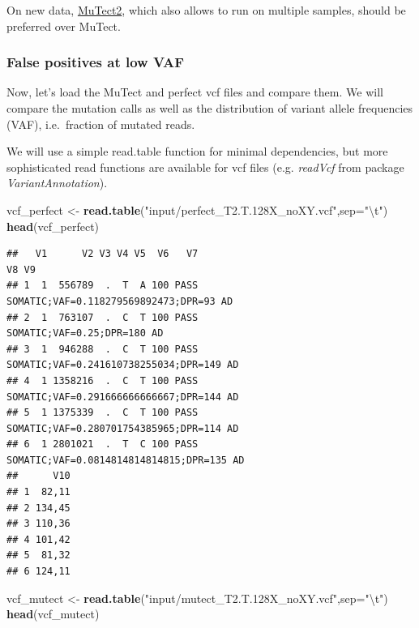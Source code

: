 \documentclass[]{article}
\newenvironment{Shaded}{\begin{snugshade}}{\end{snugshade}}
\newcommand{\CharTok}[1]{\textcolor[rgb]{0.31,0.60,0.02}{#1}}
\newcommand{\DataTypeTok}[1]{\textcolor[rgb]{0.13,0.29,0.53}{#1}}
\newcommand{\KeywordTok}[1]{\textcolor[rgb]{0.13,0.29,0.53}{\textbf{#1}}}
\newcommand{\NormalTok}[1]{#1}
\newcommand{\StringTok}[1]{\textcolor[rgb]{0.31,0.60,0.02}{#1}}
\begin{document}
On new data,
\href{https://gatk.broadinstitute.org/hc/en-us/articles/360037593851-Mutect2}{MuTect2},
which also allows to run on multiple samples, should be preferred over
MuTect.

\hypertarget{false-positives-at-low-vaf}{%
\subsubsection{False positives at low
VAF}\label{false-positives-at-low-vaf}}

Now, let's load the MuTect and perfect vcf files and compare them. We
will compare the mutation calls as well as the distribution of variant
allele frequencies (VAF), i.e.~fraction of mutated reads.

We will use a simple read.table function for minimal dependencies, but
more sophisticated read functions are available for vcf files (e.g.
\emph{readVcf} from package \emph{VariantAnnotation}).

\begin{Shaded}
\begin{Highlighting}[]
\NormalTok{vcf_perfect <-}\StringTok{ }\KeywordTok{read.table}\NormalTok{(}\StringTok{"input/perfect_T2.T.128X_noXY.vcf"}\NormalTok{,}\DataTypeTok{sep=}\StringTok{"}\CharTok{\textbackslash{}t}\StringTok{"}\NormalTok{)}
\KeywordTok{head}\NormalTok{(vcf_perfect)}
\end{Highlighting}
\end{Shaded}

\begin{verbatim}
##   V1      V2 V3 V4 V5  V6   V7                                     V8 V9
## 1  1  556789  .  T  A 100 PASS   SOMATIC;VAF=0.118279569892473;DPR=93 AD
## 2  1  763107  .  C  T 100 PASS               SOMATIC;VAF=0.25;DPR=180 AD
## 3  1  946288  .  C  T 100 PASS  SOMATIC;VAF=0.241610738255034;DPR=149 AD
## 4  1 1358216  .  C  T 100 PASS  SOMATIC;VAF=0.291666666666667;DPR=144 AD
## 5  1 1375339  .  C  T 100 PASS  SOMATIC;VAF=0.280701754385965;DPR=114 AD
## 6  1 2801021  .  T  C 100 PASS SOMATIC;VAF=0.0814814814814815;DPR=135 AD
##      V10
## 1  82,11
## 2 134,45
## 3 110,36
## 4 101,42
## 5  81,32
## 6 124,11
\end{verbatim}

\begin{Shaded}
\begin{Highlighting}[]
\NormalTok{vcf_mutect <-}\StringTok{ }\KeywordTok{read.table}\NormalTok{(}\StringTok{"input/mutect_T2.T.128X_noXY.vcf"}\NormalTok{,}\DataTypeTok{sep=}\StringTok{"}\CharTok{\textbackslash{}t}\StringTok{"}\NormalTok{)}
\KeywordTok{head}\NormalTok{(vcf_mutect)}
\end{Highlighting}
\end{Shaded}
\end{document}
